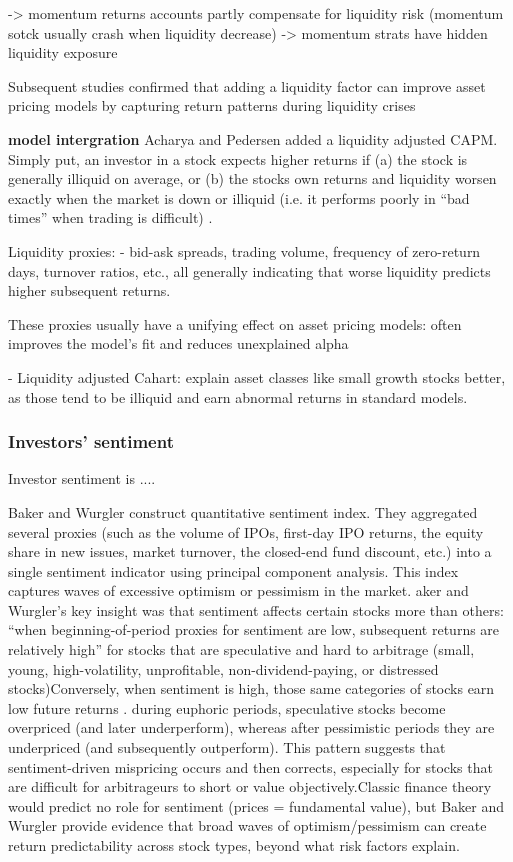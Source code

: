 -> momentum returns accounts partly compensate for liquidity risk (momentum sotck usually crash when liquidity decrease) -> momentum strats have hidden liquidity exposure

Subsequent studies confirmed that adding a liquidity factor can improve asset pricing models by capturing return patterns during liquidity crises

\textbf{model intergration}
Acharya and Pedersen added a liquidity adjusted CAPM. Simply put, an investor in a stock expects higher returns if (a) the stock is generally illiquid on average, or (b) the stocks own returns and liquidity worsen exactly when the market is down or illiquid (i.e. it performs poorly in “bad times” when trading is difficult) . 

Liquidity proxies:
- bid-ask spreads, trading volume, frequency of zero-return days, turnover ratios, etc., all generally indicating that worse liquidity predicts higher subsequent returns.

These proxies usually have a unifying effect on asset pricing models: often improves the model’s fit and reduces unexplained alpha

- Liquidity adjusted Cahart: explain asset classes like small growth stocks better, as those tend to be illiquid and earn abnormal returns in standard models.

\subsubsection{Investors' sentiment}

Investor sentiment is ....

Baker and Wurgler construct quantitative sentiment index. They aggregated several proxies (such as the volume of IPOs, first-day IPO returns, the equity share in new issues, market turnover, the closed-end fund discount, etc.) into a single sentiment indicator using principal component analysis. This index captures waves of excessive optimism or pessimism in the market. aker and Wurgler’s key insight was that sentiment affects certain stocks more than others: “when beginning-of-period proxies for sentiment are low, subsequent returns are relatively high” for stocks that are speculative and hard to arbitrage (small, young, high-volatility, unprofitable, non-dividend-paying, or distressed stocks)Conversely, when sentiment is high, those same categories of stocks earn low future returns . during euphoric periods, speculative stocks become overpriced (and later underperform), whereas after pessimistic periods they are underpriced (and subsequently outperform). This pattern suggests that sentiment-driven mispricing occurs and then corrects, especially for stocks that are difficult for arbitrageurs to short or value objectively.Classic finance theory would predict no role for sentiment (prices = fundamental value), but Baker and Wurgler provide evidence that broad waves of optimism/pessimism can create return predictability across stock types, beyond what risk factors explain.



